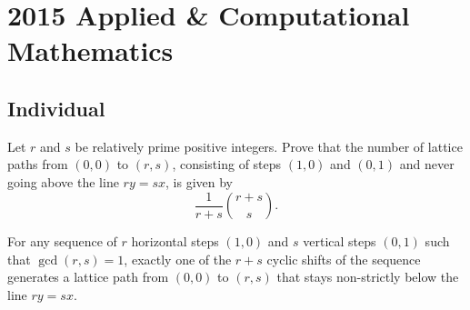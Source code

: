 \section{2015 Applied \& Computational Mathematics}

\subsection{Individual}

\begin{exercise}
\label{applied:2015:1}
Let $r$ and $s$ be relatively prime positive integers. Prove that the number of lattice paths from $(0,0)$ to $(r,s)$, consisting of steps $(1,0)$ and $(0,1)$ and never going above the line $ry=sx$, is given by
\[
\frac{1}{r+s}\binom{r+s}{s}.
\]
\end{exercise}

\begin{lemma}
For any sequence of $r$ horizontal steps $(1,0)$ and $s$ vertical steps $(0,1)$ such that $\gcd(r,s)=1$, exactly one of the $r+s$ cyclic shifts of the sequence generates a lattice path from $(0,0)$ to $(r,s)$ that stays non-strictly below the line $ry=sx$.
\end{lemma}

